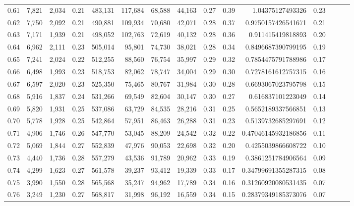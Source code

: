 \begin{tabular}{rrrrrrrrrrrrrrr}
0.61 &   7,821 &  2,034 &  0.21 &  483,131 &  117,684 &   68,588 &   44,163 &  0.27 &  0.39 &      1.04375127493326 &      0.23 \\
0.62 &   7,750 &  2,092 &  0.21 &  490,881 &  109,934 &   70,680 &   42,071 &  0.28 &  0.37 &    0.9750157426541671 &      0.21 \\
0.63 &   7,171 &  1,939 &  0.21 &  498,052 &  102,763 &   72,619 &   40,132 &  0.28 &  0.36 &     0.911415419818893 &      0.20 \\
0.64 &   6,962 &  2,111 &  0.23 &  505,014 &   95,801 &   74,730 &   38,021 &  0.28 &  0.34 &    0.8496687390799195 &      0.19 \\
0.65 &   7,241 &  2,024 &  0.22 &  512,255 &   88,560 &   76,754 &   35,997 &  0.29 &  0.32 &    0.7854475791788986 &      0.17 \\
0.66 &   6,498 &  1,993 &  0.23 &  518,753 &   82,062 &   78,747 &   34,004 &  0.29 &  0.30 &    0.7278161612757315 &      0.16 \\
0.67 &   6,597 &  2,020 &  0.23 &  525,350 &   75,465 &   80,767 &   31,984 &  0.30 &  0.28 &    0.6693067023795798 &      0.15 \\
0.68 &   5,916 &  1,837 &  0.24 &  531,266 &   69,549 &   82,604 &   30,147 &  0.30 &  0.27 &     0.616837101223049 &      0.14 \\
0.69 &   5,820 &  1,931 &  0.25 &  537,086 &   63,729 &   84,535 &   28,216 &  0.31 &  0.25 &    0.5652189337566851 &      0.13 \\
0.70 &   5,778 &  1,928 &  0.25 &  542,864 &   57,951 &   86,463 &   26,288 &  0.31 &  0.23 &    0.5139732685297691 &      0.12 \\
0.71 &   4,906 &  1,746 &  0.26 &  547,770 &   53,045 &   88,209 &   24,542 &  0.32 &  0.22 &   0.47046145932186856 &      0.11 \\
0.72 &   5,069 &  1,844 &  0.27 &  552,839 &   47,976 &   90,053 &   22,698 &  0.32 &  0.20 &    0.4255039866608722 &      0.10 \\
0.73 &   4,440 &  1,736 &  0.28 &  557,279 &   43,536 &   91,789 &   20,962 &  0.33 &  0.19 &    0.3861251784906564 &      0.09 \\
0.74 &   4,299 &  1,623 &  0.27 &  561,578 &   39,237 &   93,412 &   19,339 &  0.33 &  0.17 &   0.34799691355287315 &      0.08 \\
0.75 &   3,990 &  1,550 &  0.28 &  565,568 &   35,247 &   94,962 &   17,789 &  0.34 &  0.16 &   0.31260920080531435 &      0.07 \\
0.76 &   3,249 &  1,230 &  0.27 &  568,817 &   31,998 &   96,192 &   16,559 &  0.34 &  0.15 &   0.28379349185373076 &      0.07 \\

\end{tabular}
